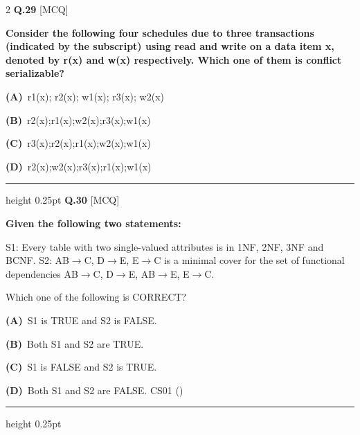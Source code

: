 \documentclass[a4paper,10pt,twoside]{article}
\begin{document}
\begin{multicols}{2}
\noindent\textbf{Q.29} \hfill {\footnotesize\textsf{[MCQ]}}
\par\vspace{2pt}
{\bfseries Consider the following four schedules due to three transactions (indicated by the subscript) using
read and write on a data item x, denoted by r(x) and w(x) respectively. Which one of them is
conflict serializable? \par}
\par\vspace{2pt}\noindent
\textbf{(A)}~r1(x); r2(x); w1(x); r3(x); w2(x)\par\vspace{2pt}\noindent
\textbf{(B)}~r2(x);r1(x);w2(x);r3(x);w1(x)\par\vspace{2pt}\noindent
\textbf{(C)}~r3(x);r2(x);r1(x);w2(x);w1(x)\par\vspace{2pt}\noindent
\textbf{(D)}~r2(x);w2(x);r3(x);r1(x);w1(x)
\par\vspace{6pt}\hrule height 0.25pt\vspace{6pt}
\noindent\textbf{Q.30} \hfill {\footnotesize\textsf{[MCQ]}}
\par\vspace{2pt}
{\bfseries Given the following two statements:
\par\smallskip
S1: Every table with two single-valued attributes is in 1NF, 2NF, 3NF
and BCNF.
S2: AB$\to$C, D$\to$E, E$\to$C is a minimal cover for the set of functional
dependencies AB$\to$C, D$\to$E, AB$\to$E, E$\to$C.
\par\smallskip
Which one of the following is CORRECT? \par}
\par\vspace{2pt}\noindent
\textbf{(A)}~S1 is TRUE and S2 is FALSE.\par\vspace{2pt}\noindent
\textbf{(B)}~Both S1 and S2 are TRUE.\par\vspace{2pt}\noindent
\textbf{(C)}~S1 is FALSE and S2 is TRUE.\par\vspace{2pt}\noindent
\textbf{(D)}~Both S1 and S2 are FALSE. \newline CS01 ()
\par\vspace{6pt}\hrule height 0.25pt\vspace{6pt}

\end{multicols}
\end{document}
